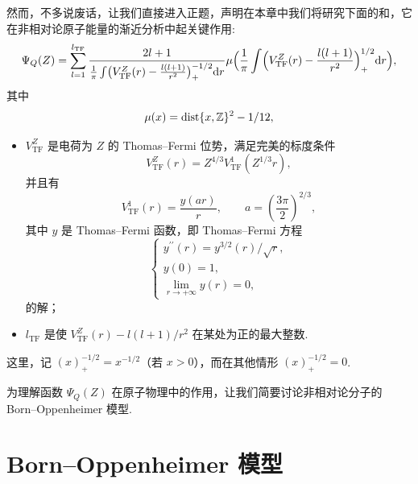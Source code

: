 然而，不多说废话，让我们直接进入正题，声明在本章中我们将研究下面的和，它在非相对论原子能量的渐近分析中起关键作用:
\begin{align*}
  \Psi_{Q}(Z)=\sum_{l=1}^{l_{\mathrm{TF}}}\frac{2l+1}{
  \frac{1}{\pi}\int\bigl(V_{\mathrm{TF}}^{Z}(r)-\frac{l(l+1)}{r^{2}}\bigr)_{+}^{-1/2}\mathrm{d}r}
  \mu\Bigl(\frac{1}{\pi}\int\Bigl(V_{\mathrm{TF}}^{Z}(r)-\frac{l(l+1)}{r^{2}}\Bigr)_{+}^{1/2}\mathrm{d}r\Bigr),
\end{align*}
其中
\begin{align*}
  \mu(x)=\operatorname{dist}\{x,\mathbb{Z}\}^{2}-1/12,
\end{align*}
\begin{itemize}
\item $V_{\mathrm{TF}}^{Z}$ 是电荷为 $Z$ 的 Thomas--Fermi 位势，满足完美的标度条件
\begin{equation}\label{eq:9.1}
  V_{\mathrm{TF}}^{Z}(r)=Z^{4/3}V_{\mathrm{TF}}^{1}(Z^{1/3}r),
\end{equation}
并且有
\begin{equation}\label{eq:9.2}
  V_{\mathrm{TF}}^{1}(r)=\frac{y(ar)}{r},\qquad a=\left(\frac{3\pi}{2}\right)^{2/3},
\end{equation}
其中 $y$ 是 Thomas--Fermi 函数，即 Thomas--Fermi 方程
\begin{equation}\label{eq:9.3}
  \begin{cases}
    y^{\prime\prime}(r)=y^{3/2}(r)/\sqrt{r},\\
    y(0)=1,\\
    \lim_{r\to+\infty}y(r)=0,
  \end{cases}
\end{equation}
的解；

\item $l_{\mathrm{TF}}$ 是使 $V_{\mathrm{TF}}^{Z}(r) - l(l+1)/r^{2}$ 在某处为正的最大整数.
\end{itemize}
这里，记 $(x)_{+}^{-1/2} = x^{-1/2}$（若 $x > 0$），而在其他情形 $(x)_{+}^{-1/2} = 0$.

为理解函数 $\Psi_Q(Z)$ 在原子物理中的作用，让我们简要讨论非相对论分子的 Born--Oppenheimer 模型.

\section{Born--Oppenheimer 模型}

